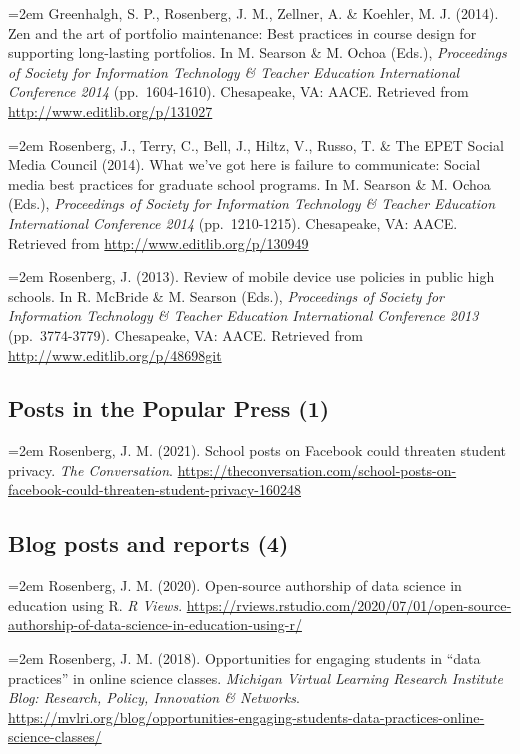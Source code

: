 \documentclass[
  14,
]{article}
\begin{document}
\hangindent=2em Greenhalgh, S. P., Rosenberg, J. M., Zellner, A. \&
Koehler, M. J. (2014). Zen and the art of portfolio maintenance: Best
practices in course design for supporting long-lasting portfolios. In M.
Searson \& M. Ochoa (Eds.), \emph{Proceedings of Society for Information
Technology \& Teacher Education International Conference 2014}
(pp.~1604-1610). Chesapeake, VA: AACE. Retrieved from
\url{http://www.editlib.org/p/131027}

\hangindent=2em Rosenberg, J., Terry, C., Bell, J., Hiltz, V., Russo, T.
\& The EPET Social Media Council (2014). What we've got here is failure
to communicate: Social media best practices for graduate school
programs. In M. Searson \& M. Ochoa (Eds.), \emph{Proceedings of Society
for Information Technology \& Teacher Education International Conference
2014} (pp.~1210-1215). Chesapeake, VA: AACE. Retrieved from
\url{http://www.editlib.org/p/130949}

\hangindent=2em Rosenberg, J. (2013). Review of mobile device use
policies in public high schools. In R. McBride \& M. Searson (Eds.),
\emph{Proceedings of Society for Information Technology \& Teacher
Education International Conference 2013} (pp.~3774-3779). Chesapeake,
VA: AACE. Retrieved from \url{http://www.editlib.org/p/48698git}

\hypertarget{posts-in-the-popular-press-1}{%
\subsection{Posts in the Popular Press
(1)}\label{posts-in-the-popular-press-1}}

\hangindent=2em Rosenberg, J. M. (2021). School posts on Facebook could
threaten student privacy. \emph{The Conversation}.
\url{https://theconversation.com/school-posts-on-facebook-could-threaten-student-privacy-160248}

\hypertarget{blog-posts-and-reports-4}{%
\subsection{Blog posts and reports (4)}\label{blog-posts-and-reports-4}}

\hangindent=2em Rosenberg, J. M. (2020). Open-source authorship of data
science in education using R. \emph{R Views}.
\url{https://rviews.rstudio.com/2020/07/01/open-source-authorship-of-data-science-in-education-using-r/}

\hangindent=2em Rosenberg, J. M. (2018). Opportunities for engaging
students in ``data practices'' in online science classes. \emph{Michigan
Virtual Learning Research Institute Blog: Research, Policy, Innovation
\& Networks}.
\url{https://mvlri.org/blog/opportunities-engaging-students-data-practices-online-science-classes/}
\end{document}
